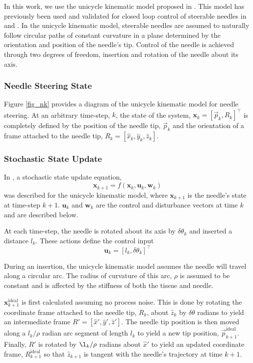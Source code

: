 \documentclass[journal,transmag]{IEEEtran}
\begin{document}
In this work, we use the unicycle kinematic model proposed in \cite{Park2005}.  This model has previously been used and validated for closed loop control of steerable needles in \cite{Majewicz2013} and \cite{adebar2014recursive}.  In the unicycle kinematic model, steerable needles are assumed to naturally follow circular paths of constant curvature in a plane determined by the orientation and position of the needle's tip.  Control of the needle is achieved through two degrees of freedom, insertion and rotation of the needle about its axis.

\subsubsection{Needle Steering State}
Figure \ref{fig_nk} provides a diagram of the unicycle kinematic model for needle steering.  At an arbitrary time-step, $k$, the state of the system, $\mathbf{x}_k = \left[\vec{p}_k, R_k\right]^\top$ is completely defined by the position of the needle tip, $\vec{p}_k$ and the orientation of a frame attached to the needle tip, $R_k = \left[\hat{x}_k,\hat{y}_k,\hat{z}_k\right]$.

\subsubsection{Stochastic State Update}
In \cite{adebar2014recursive}, a stochastic state update equation,
\begin{equation*}
\mathbf{x}_{k+1} = f(\mathbf{x}_k, \mathbf{u}_k, \mathbf{w}_k)
\end{equation*}  
was described for the unicycle kinematic model, where $\mathbf{x}_{k+1}$ is the needle's state at time-step $k+1$. $\mathbf{u}_k$ and $\mathbf{w}_k$ are the control and disturbance vectors at time $k$ and are described below.  

At each time-step, the needle is rotated about its axis by $\delta \theta_k$ and inserted a distance $l_k$.  These actions define the control input 
\begin{equation*}
\mathbf{u}_k = \left[l_k, \delta\theta_k\right]^\top
\end{equation*}  

During an insertion, the unicycle kinematic model assumes the needle will travel along a circular arc.  The radius of curvature of this arc, $\rho$ is assumed to be constant and is affected by the stiffness of both the tissue and needle.  

$\mathbf{x}^{\text{ideal}}_{k+1}$ is first calculated assuming no process noise.  This is done by rotating the coordinate frame attached to the needle tip, $R_k$, about $\hat{z}_k$ by $\delta \theta$ radians to yield an intermediate frame $R' = [\hat{x}', \hat{y}', \hat{z}']$.  The needle tip position is then moved along a $l_k/\rho$ radian arc segment of length $l_k$ to yield a new tip position, $\vec{p}^{\text{ideal}}_{k+1}$.  Finally, $R'$ is rotated by $\l_k/\rho$ radians about $\hat{x}'$ to yield an updated coordinate frame, $R^{\text{ideal}}_{k+1}$ so that $\hat{z}_{k+1}$ is tangent with the needle's trajectory at time $k+1$.  
\end{document}
